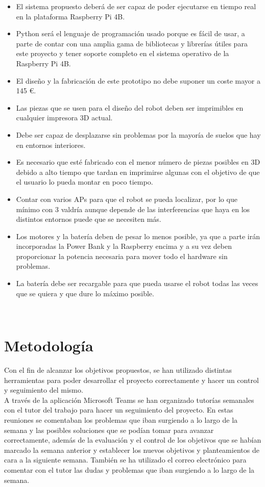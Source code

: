 \begin{itemize}
 \item \textit{} El sistema propuesto deberá de ser capaz de poder ejecutarse en tiempo real en la plataforma Raspberry Pi 4B.
 \item \textit{} Python será el lenguaje de programación usado porque es fácil de usar, a parte de contar con una amplia gama de bibliotecas 
 y librerías útiles para este proyecto y tener soporte completo en el sistema operativo de la Raspberry Pi 4B.
 \item \textit{} El diseño y la fabricación de este prototipo no debe suponer un coste mayor a 145 \euro.
 \item \textit{} Las piezas que se usen para el diseño del robot deben ser imprimibles en cualquier impresora 3D actual.
 \item \textit{} Debe ser capaz de desplazarse sin problemas por la mayoría de suelos que hay en entornos interiores.
 \item \textit{} Es necesario que esté fabricado con el menor número de piezas posibles en 3D debido a alto tiempo que tardan en imprimirse algunas
 con el objetivo de que el usuario lo pueda montar en poco tiempo.
 \item \textit{} Contar con varios APs para que el robot se pueda localizar, por lo que mínimo con 3 valdría aunque depende de las interferencias que haya en los distintos entornos puede que se necesiten más.
 \item \textit{} Los motores y la batería deben de pesar lo menos posible, ya que a parte irán incorporadas la Power Bank y la Raspberry encima y a su vez deben proporcionar la potencia necesaria para mover todo el hardware sin problemas.
 \item \textit{} La batería debe ser recargable para que pueda usarse el robot todas las veces que se quiera y que dure lo máximo posible.
 
\end{itemize}\

 
\section{Metodología}
\label{sec:metodologia}

Con el fin de alcanzar los objetivos propuestos, se han utilizado distintas herramientas para poder desarrollar el proyecto correctamente y
hacer un control y seguimiento del mismo.\\

A través de la aplicación Microsoft Teams se han organizado tutorías semanales con el tutor del trabajo para hacer un seguimiento del proyecto. En estas reuniones se comentaban los problemas que iban surgiendo a lo largo de la semana y las posibles soluciones que se podían tomar para avanzar correctamente, además de la evaluación y el control de los objetivos que se habían marcado la semana anterior y establecer los nuevos objetivos y planteamientos de cara a la siguiente semana. También se ha utilizado el correo electrónico para comentar con el tutor las dudas y problemas que iban surgiendo a lo largo de la semana.\\ 

